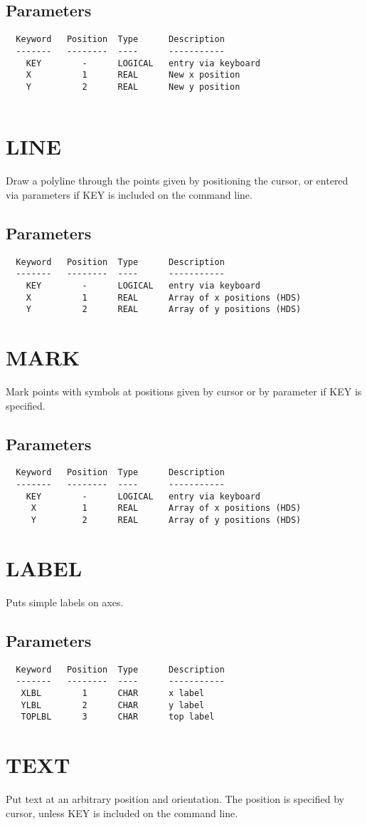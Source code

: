 \documentclass{book}
\renewcommand{\_}{{\tt\char'137}}     %
\begin{document}
\subsection{Parameters}
\begin{verbatim}
  Keyword   Position  Type      Description
  -------   --------  ----      -----------
    KEY        -      LOGICAL   entry via keyboard
    X          1      REAL      New x position
    Y          2      REAL      New y position
 
\end{verbatim}\section{LINE}
Draw a polyline through the points given by positioning
the cursor, or entered via parameters if KEY is included
on the command line.
 
\subsection{Parameters}
\begin{verbatim}
  Keyword   Position  Type      Description
  -------   --------  ----      -----------
    KEY        -      LOGICAL   entry via keyboard
    X          1      REAL      Array of x positions (HDS)
    Y          2      REAL      Array of y positions (HDS)
\end{verbatim}\section{MARK}
Mark points with symbols at positions given by cursor
or by parameter if KEY is specified.
 
\subsection{Parameters}
\begin{verbatim}
  Keyword   Position  Type      Description
  -------   --------  ----      -----------
    KEY        -      LOGICAL   entry via keyboard
     X         1      REAL      Array of x positions (HDS)
     Y         2      REAL      Array of y positions (HDS)
\end{verbatim}\section{LABEL}
Puts simple labels on axes.
\subsection{Parameters}
\begin{verbatim}
  Keyword   Position  Type      Description
  -------   --------  ----      -----------
   XLBL        1      CHAR      x label
   YLBL        2      CHAR      y label
   TOPLBL      3      CHAR      top label
\end{verbatim}\section{TEXT}
Put text at an arbitrary position and orientation. The position
is specified by cursor, unless KEY is included on the command line.
\end{document}
